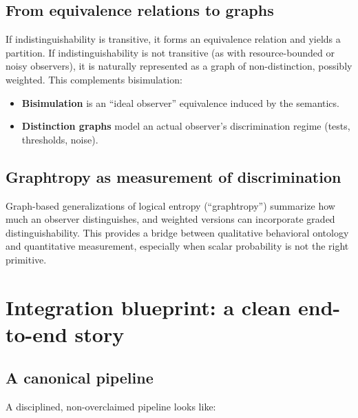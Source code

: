 \documentclass[11pt]{article}
\theoremstyle{definition}
\begin{document}
\subsection{From equivalence relations to graphs}

If indistinguishability is transitive, it forms an equivalence relation and yields a partition.
If indistinguishability is not transitive (as with resource-bounded or noisy observers),
it is naturally represented as a graph of non-distinction, possibly weighted.
This complements bisimulation:
\begin{itemize}[leftmargin=1.5em]
\item \textbf{Bisimulation} is an ``ideal observer'' equivalence induced by the semantics.
\item \textbf{Distinction graphs} model an actual observer's discrimination regime (tests, thresholds, noise).
\end{itemize}

\subsection{Graphtropy as measurement of discrimination}

Graph-based generalizations of logical entropy (``graphtropy'') summarize how much an observer distinguishes,
and weighted versions can incorporate graded distinguishability.
This provides a bridge between qualitative behavioral ontology and quantitative measurement,
especially when scalar probability is not the right primitive.

\section{Integration blueprint: a clean end-to-end story}

\subsection{A canonical pipeline}

A disciplined, non-overclaimed pipeline looks like:
\end{document}
